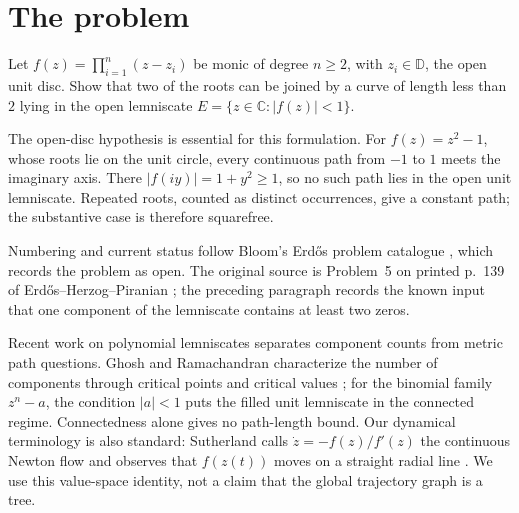 \documentclass[11pt]{article}
\newcommand{\dbar}{\mathbb{D}}
\begin{document}
\section{The problem}\label{sec:problem}

\begin{problem}[Erd\H{o}s \#1041]\label{res:problem}
Let $f(z)=\prod_{i=1}^{n}(z-z_i)$ be monic of degree $n\ge2$, with
$z_i\in\dbar$, the open unit disc.  Show that two of the roots can be joined by a curve of length less than
$2$ lying in the open lemniscate $E=\{z\in\mathbb{C}:|f(z)|<1\}$.
\end{problem}

The open-disc hypothesis is essential for this formulation.  For
$f(z)=z^2-1$, whose roots lie on the unit circle, every continuous path from
$-1$ to $1$ meets the imaginary axis.  There $|f(iy)|=1+y^2\ge1$, so no
such path lies in the open unit lemniscate.  Repeated roots, counted as distinct
occurrences, give a constant path; the substantive case is therefore
squarefree.

\noindent Numbering and current status follow Bloom's Erd\H{o}s problem
catalogue \cite{bloom}, which records the problem as open.
The original source is Problem~5 on printed p.~139 of
Erd\H{o}s--Herzog--Piranian \cite[p.~139]{ehp1958}; the preceding paragraph records the
known input that one component of the lemniscate contains at least two zeros.

Recent work on polynomial lemniscates separates component counts from metric
path questions. Ghosh and Ramachandran characterize the number of components
through critical points and critical values \cite[Lemma~7]{ghosh2023}; for the
binomial family $z^n-a$, the condition $|a|<1$ puts the filled unit lemniscate
in the connected regime. Connectedness alone gives no path-length bound.
Our dynamical terminology is also standard: Sutherland calls
$\dot z=-f(z)/f'(z)$ the continuous Newton flow and observes that $f(z(t))$
moves on a straight radial line \cite[p.~42]{sutherland1992}. We use this
value-space identity, not a claim that the global trajectory graph is a tree.
\end{document}
